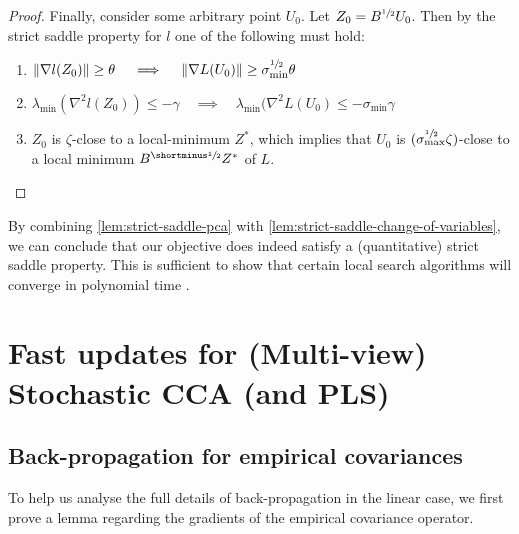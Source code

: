 \begin{proof}
    Finally, consider some arbitrary point $U_0$. Let $Z_0 = B^{\sfrac{1}{2}} U_0$. Then by the strict saddle property for $l$ one of the following must hold:
    \begin{enumerate}
        \item $\lVert\nabla l (Z_0)\rVert \geq \theta \quad \implies \quad \lVert\nabla L(U_0)\rVert \geq \sigma_\text{min}^{\sfrac{1}{2}} \theta$
        \item $\lambda_{\text{min}}(\nabla^2 l(Z_0)) \leq - \gamma \quad \implies \quad \lambda_{\text{min}}(\nabla^2 L(U_0) \leq - \sigma_{\text{min}} \gamma$
        \item $Z_0$ is $\zeta$-close to a local-minimum $Z^*$, which implies that $U_0$ is $(\sigma_\text{max}^{\sfrac{1}{2}} \zeta)$-close to a local minimum $B^\mhalf Z^*$ of $L$.
    \end{enumerate}
\end{proof}

By combining \cref{lem:strict-saddle-pca} with \cref{lem:strict-saddle-change-of-variables}, we can conclude that our objective does indeed satisfy a (quantitative) strict saddle property.
This is sufficient to show that certain local search algorithms will converge in polynomial time \cite{ge_no_2017}.

\newpage

\section{Fast updates for (Multi-view) Stochastic CCA (and PLS)}\label{supp:fast-updates}
\subsection{Back-propagation for empirical covariances}
To help us analyse the full details of back-propagation in the linear case, we first prove a lemma regarding the gradients of the empirical covariance operator.

